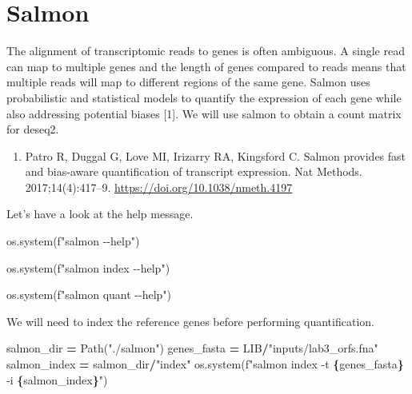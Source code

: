 \documentclass[
]{book}
\newenvironment{Shaded}{\begin{snugshade}}{\end{snugshade}}
\newcommand{\NormalTok}[1]{#1}
\newcommand{\OperatorTok}[1]{\textcolor[rgb]{0.81,0.36,0.00}{\textbf{#1}}}
\newcommand{\SpecialCharTok}[1]{\textcolor[rgb]{0.81,0.36,0.00}{\textbf{#1}}}
\newcommand{\SpecialStringTok}[1]{\textcolor[rgb]{0.31,0.60,0.02}{#1}}
\newcommand{\StringTok}[1]{\textcolor[rgb]{0.31,0.60,0.02}{#1}}
\providecommand{\tightlist}{%
  \setlength{\itemsep}{0pt}\setlength{\parskip}{0pt}}
\begin{document}
\section{Salmon}\label{salmon}

The alignment of transcriptomic reads to genes is often ambiguous. A single read can map to multiple genes and the length of genes compared to reads
means that multiple reads will map to different regions of the same gene. Salmon uses probabilistic and statistical models to quantify the expression of
each gene while also addressing potential biases {[}1{]}. We will use salmon to obtain a count matrix for deseq2.

\begin{enumerate}
\def\labelenumi{\arabic{enumi}.}
\tightlist
\item
  Patro R, Duggal G, Love MI, Irizarry RA, Kingsford C. Salmon provides fast and bias-aware quantification of transcript expression. Nat Methods. 2017;14(4):417--9. \url{https://doi.org/10.1038/nmeth.4197}
\end{enumerate}

Let's have a look at the help message.

\begin{Shaded}
\begin{Highlighting}[numbers=left,,]
\NormalTok{os.system(}\SpecialStringTok{f"salmon {-}{-}help"}\NormalTok{)}
\end{Highlighting}
\end{Shaded}

\begin{Shaded}
\begin{Highlighting}[numbers=left,,]
\NormalTok{os.system(}\SpecialStringTok{f"salmon index {-}{-}help"}\NormalTok{)}
\end{Highlighting}
\end{Shaded}

\begin{Shaded}
\begin{Highlighting}[numbers=left,,]
\NormalTok{os.system(}\SpecialStringTok{f"salmon quant {-}{-}help"}\NormalTok{)}
\end{Highlighting}
\end{Shaded}

We will need to index the reference genes before performing quantification.

\begin{Shaded}
\begin{Highlighting}[numbers=left,,]
\NormalTok{salmon\_dir }\OperatorTok{=}\NormalTok{ Path(}\StringTok{"./salmon"}\NormalTok{)}
\NormalTok{genes\_fasta }\OperatorTok{=}\NormalTok{ LIB}\OperatorTok{/}\StringTok{"inputs/lab3\_orfs.fna"}
\NormalTok{salmon\_index }\OperatorTok{=}\NormalTok{ salmon\_dir}\OperatorTok{/}\StringTok{"index"}
\NormalTok{os.system(}\SpecialStringTok{f"salmon index {-}t }\SpecialCharTok{\{}\NormalTok{genes\_fasta}\SpecialCharTok{\}}\SpecialStringTok{ {-}i }\SpecialCharTok{\{}\NormalTok{salmon\_index}\SpecialCharTok{\}}\SpecialStringTok{"}\NormalTok{)}
\end{Highlighting}
\end{Shaded}
\end{document}
